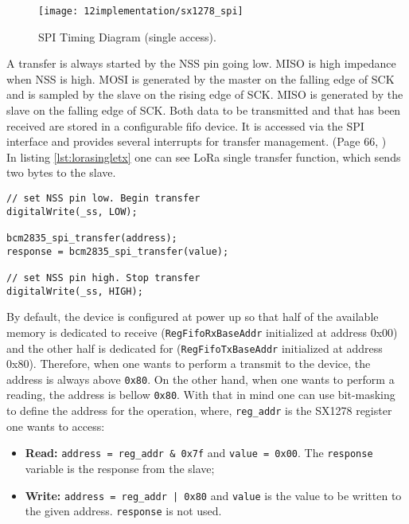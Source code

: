 \begin{figure}[H]
	\centering	
	\texttt{[image: 12implementation/sx1278\_spi]}
	\caption{SPI Timing Diagram (single access).}
	\label{fig:sx1278_spi}
\end{figure}

A transfer is always started by the NSS pin going low. MISO is high impedance when NSS is high. MOSI is generated by the master on the falling edge of SCK and is sampled by the slave on the rising edge of SCK. MISO is generated by the slave on the falling edge of SCK. Both data to be transmitted and that has been received are stored in a configurable \ac{fifo} device. It is accessed via the SPI interface and provides several interrupts for transfer management. (Page 66, \cite{sx1278})
\\
In listing \ref{lst:lorasingletx} one can see LoRa single transfer function, which sends two bytes to the slave. 

\clearpage
\begin{lstlisting}[caption={LoRa single transfer.}, label={lst:lorasingletx}]
// set NSS pin low. Begin transfer
digitalWrite(_ss, LOW);

bcm2835_spi_transfer(address);
response = bcm2835_spi_transfer(value);

// set NSS pin high. Stop transfer
digitalWrite(_ss, HIGH);
\end{lstlisting}

By default, the device is configured at power up so that half of the available memory is dedicated to receive
(\verb|RegFifoRxBaseAddr| initialized at address 0x00) and the other half is dedicated for  (\verb|RegFifoTxBaseAddr| initialized at address 0x80). Therefore, when one wants to perform a transmit to the device, the address is always above \verb|0x80|. On the other hand, when one wants to perform a reading, the address is bellow \verb|0x80|. With that in mind one can use bit-masking to define the address for the operation, where, \verb|reg_addr| is the SX1278 register one wants to access:

\begin{itemize}
	\item \textbf{Read:} \verb|address = reg_addr & 0x7f| and \verb|value = 0x00|. The \verb|response| variable is the response from the slave;
	
	\item \textbf{Write:} \verb+address = reg_addr | 0x80+ and \verb|value| is the value to be written to the given address. \verb|response| is not used.
\end{itemize}

